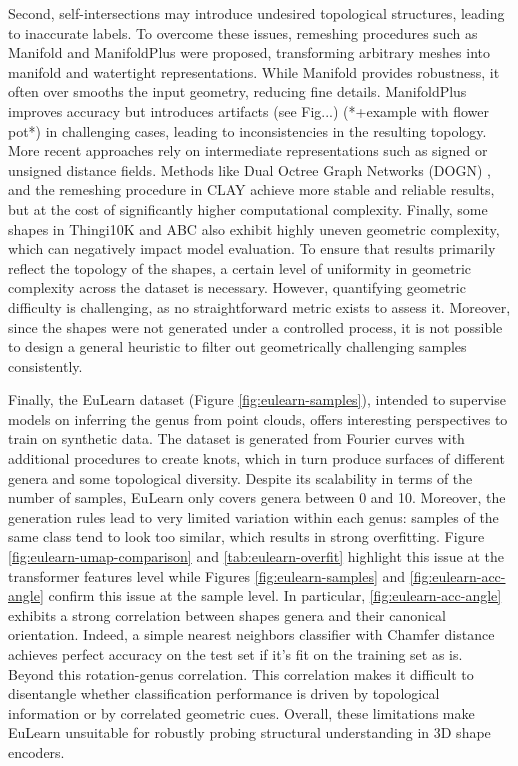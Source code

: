 Second, self-intersections may introduce undesired topological structures, leading to inaccurate labels. To overcome these issues, remeshing procedures such as Manifold \cite{manifold} and ManifoldPlus \cite{manifoldplus} were proposed, transforming arbitrary meshes into manifold and watertight representations. While Manifold provides robustness, it often over smooths the input geometry, reducing fine details. ManifoldPlus improves accuracy but introduces artifacts (see Fig...) (*+example with flower pot*) in challenging cases, leading to inconsistencies in the resulting topology. More recent approaches rely on intermediate representations such as signed or unsigned distance fields. Methods like Dual Octree Graph Networks (DOGN) \cite{dogn}, and the remeshing procedure in CLAY \cite{clay} achieve more stable and reliable results, but at the cost of significantly higher computational complexity. Finally, some shapes in Thingi10K and ABC also exhibit highly uneven geometric complexity, which can negatively impact model evaluation. To ensure that results primarily reflect the topology of the shapes, a certain level of uniformity in geometric complexity across the dataset is necessary. However, quantifying geometric difficulty is challenging, as no straightforward metric exists to assess it. Moreover, since the shapes were not generated under a controlled process, it is not possible to design a general heuristic to filter out geometrically challenging samples consistently.


Finally, the EuLearn dataset (Figure \ref{fig:eulearn-samples}), intended to supervise models on inferring the genus from point clouds, offers interesting perspectives to train on synthetic data. The dataset is generated from Fourier curves with additional procedures to create knots, which in turn produce surfaces of different genera and some topological diversity. Despite its scalability in terms of the number of samples, EuLearn only covers genera between 0 and 10. Moreover, the generation rules lead to very limited variation within each genus: samples of the same class tend to look too similar, which results in strong overfitting. Figure \ref{fig:eulearn-umap-comparison} and \ref{tab:eulearn-overfit} highlight this issue at the transformer features level while Figures \ref{fig:eulearn-samples} and \ref{fig:eulearn-acc-angle} confirm this issue at the sample level. In particular, \ref{fig:eulearn-acc-angle} exhibits a strong correlation between shapes genera and their canonical orientation. Indeed, a simple nearest neighbors classifier with Chamfer distance achieves perfect accuracy on the test set if it's fit on the training set as is. Beyond this rotation-genus correlation. This correlation makes it difficult to disentangle whether classification performance is driven by topological information or by correlated geometric cues. Overall, these limitations make EuLearn unsuitable for robustly probing structural understanding in 3D shape encoders.

